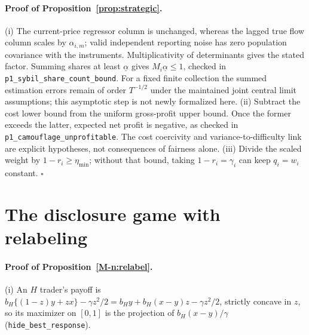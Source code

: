 \documentclass[12pt]{article}
\theoremstyle{definition}
\theoremstyle{remark}
\begin{document}
\paragraph{Proof of Proposition~\ref{prop:strategic}.}
 (i) The current-price regressor column is unchanged, whereas the lagged true flow column scales by $\alpha_{i,m}$; valid independent reporting noise has zero population covariance with the instruments. Multiplicativity of determinants gives the stated factor. Summing shares at least $\underline\alpha$ gives $M_i\underline\alpha\le1$, checked in \nolinkurl{p1_sybil_share_count_bound}. For a fixed finite collection the summed estimation errors remain of order $T^{-1/2}$ under the maintained joint central limit assumptions; this asymptotic step is not newly formalized here. (ii) Subtract the cost lower bound from the uniform gross-profit upper bound. Once the former exceeds the latter, expected net profit is negative, as checked in \nolinkurl{p1_camouflage_unprofitable}. The cost coercivity and variance-to-difficulty link are explicit hypotheses, not consequences of fairness alone. (iii) Divide the scaled weight by $1-r_i\ge\eta_{\min}$; without that bound, taking $1-r_i=\gamma_i$ can keep $q_i=w_i$ constant. $\square$

\section{The disclosure game with relabeling}\label{app:relabel}

\paragraph{Proof of Proposition~\ref{M-n:relabel}.} (i) An $H$ trader's payoff is $b_H\{(1-z)y+zx\}-\gamma z^2/2=b_Hy+b_H(x-y)z-\gamma z^2/2$, strictly concave in $z$, so its maximizer on $[0,1]$ is the projection of $b_H(x-y)/\gamma$ (\nolinkurl{hide_best_response}).
\end{document}
